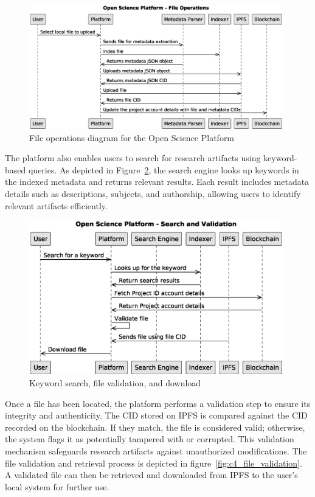 \documentclass[final]{rc-book-2.14}
\begin{document}
\begin{figure}[htbp]
    \centering
    \includegraphics[width=0.98\textwidth, keepaspectratio]{fig/c4_platform_operations_2}
    \caption{File operations diagram for the Open Science Platform}
    \label{fig:c4_file_operations_diagram}
\end{figure}

The platform also enables users to search for research artifacts using keyword-based queries. As depicted in Figure~\ref{fig:c4_keyword_search}, the search engine looks up keywords in the indexed metadata and returns relevant results. Each result includes metadata details such as descriptions, subjects, and authorship, allowing users to identify relevant artifacts efficiently.

\begin{figure}[htbp]
    \centering
    \includegraphics[width=0.98\textwidth, keepaspectratio]{fig/c4_searching_and_validation.eps}
    \caption{Keyword search, file validation, and download}
    \label{fig:c4_keyword_search}
\end{figure}

Once a file has been located, the platform performs a validation step to ensure its integrity and authenticity. The CID stored on IPFS is compared against the CID recorded on the blockchain. If they match, the file is considered valid; otherwise, the system flags it as potentially tampered with or corrupted. This validation mechanism safeguards research artifacts against unauthorized modifications. The file validation and retrieval process is depicted in figure~\ref{fig:c4_file_validation}. A validated file can then be retrieved and downloaded from IPFS to the user's local system for further use.
\end{document}
